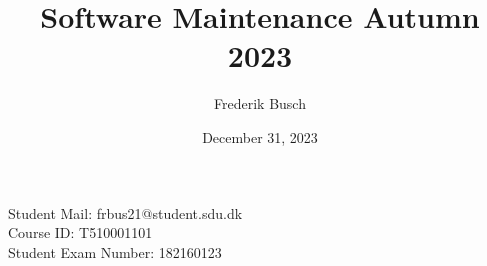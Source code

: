 \documentclass{article}
\title{%
    \bf{Software Maintenance Autumn 2023} \\
    
}
\author{Frederik Busch}
\date{December 31, 2023}
\begin{document}
\maketitle
\vspace{\fill}
\begin{center}
    \bf{%

        Student Mail: frbus21@student.sdu.dk\\
        Course ID: T510001101 \\
        Student Exam Number: 182160123}
\end{center}
\newpage
\setcounter{tocdepth}{2}
\tableofcontents
\newpage












\end{document}
